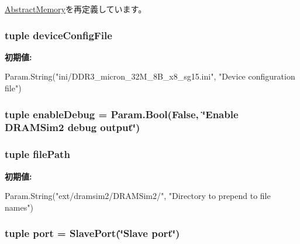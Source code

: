 \hyperlink{classAbstractMemory_1_1AbstractMemory_a17da7064bc5c518791f0c891eff05fda}{AbstractMemory}を再定義しています。\hypertarget{classDRAMSim2_1_1DRAMSim2_a4b5e3cc9f96e106d875d9293a89f8e2b}{
\subsubsection[{deviceConfigFile}]{\setlength{\rightskip}{0pt plus 5cm}tuple {\bf deviceConfigFile}}}
\label{classDRAMSim2_1_1DRAMSim2_a4b5e3cc9f96e106d875d9293a89f8e2b}
{\bfseries 初期値:}
\begin{DoxyCode}
Param.String("ini/DDR3_micron_32M_8B_x8_sg15.ini",
                                    "Device configuration file")
\end{DoxyCode}
\hypertarget{classDRAMSim2_1_1DRAMSim2_ae8a58e1159960431c8e7591c366d5d26}{
\subsubsection[{enableDebug}]{\setlength{\rightskip}{0pt plus 5cm}tuple {\bf enableDebug} = Param.Bool(False, \char`\"{}Enable {\bf DRAMSim2} debug output\char`\"{})}}
\label{classDRAMSim2_1_1DRAMSim2_ae8a58e1159960431c8e7591c366d5d26}
\hypertarget{classDRAMSim2_1_1DRAMSim2_ac86ae01991020419ad74797268fe6d3f}{
\subsubsection[{filePath}]{\setlength{\rightskip}{0pt plus 5cm}tuple {\bf filePath}}}
\label{classDRAMSim2_1_1DRAMSim2_ac86ae01991020419ad74797268fe6d3f}
{\bfseries 初期値:}
\begin{DoxyCode}
Param.String("ext/dramsim2/DRAMSim2/",
                            "Directory to prepend to file names")
\end{DoxyCode}
\hypertarget{classDRAMSim2_1_1DRAMSim2_a1aadf525515ecfcf662c2aa51a503763}{
\subsubsection[{port}]{\setlength{\rightskip}{0pt plus 5cm}tuple {\bf port} = {\bf SlavePort}(\char`\"{}Slave {\bf port}\char`\"{})}}
